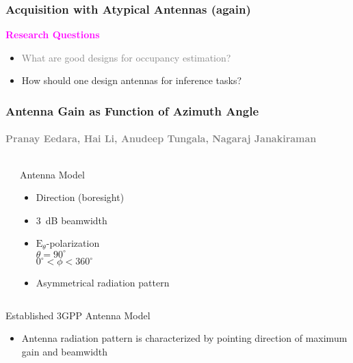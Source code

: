 \documentclass{beamer}
\begin{document}




\begin{frame}
\frametitle{Acquisition with Atypical Antennas (again)}
\begin{block}{\textcolor{magenta}{\textbf{Research Questions}}}
\begin{itemize}
  \item \textcolor{gray}{What are good designs for occupancy estimation?}
  \item How should one design antennas for inference tasks?
\end{itemize}
\end{block}
\begin{center}
  
\end{center}
\end{frame}

\begin{frame}
\frametitle{Antenna Gain as Function of Azimuth Angle}
\framesubtitle{\textcolor{gray}{\scriptsize Pranay Eedara, Hai Li, Anudeep Tungala, Nagaraj Janakiraman}}
\begin{columns}
  \begin{center}
  \scalebox{0.70}{}
  \end{center}
\begin{block}{Antenna Model}
  \begin{itemize}
  \item Direction (boresight)
  \item 3~dB beamwidth
  \item $\mathrm{E}_{\theta}$-polarization\\
    $\theta = 90^{\circ}$\\
    $0^{\circ} < \phi < 360^{\circ}$
  \item Asymmetrical radiation pattern
  \end{itemize}
\end{block}
\end{columns}
\vfill
\begin{block}{Established 3GPP Antenna Model}
  \begin{itemize}
  \item Antenna radiation pattern is characterized by pointing direction of maximum gain and beamwidth
  \end{itemize}
\end{block}
\end{frame}
\end{document}
